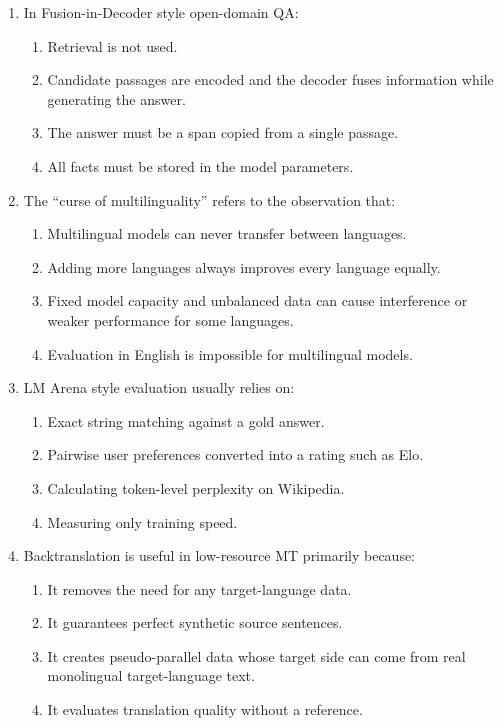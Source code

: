 \documentclass[11pt,a4paper]{article}
\begin{document}
\begin{enumerate}[leftmargin=*]
\begin{enumerate}
\item In Fusion-in-Decoder style open-domain QA:
\begin{enumerate}[label=\Alph*.]
\item Retrieval is not used.
\item Candidate passages are encoded and the decoder fuses information while generating the answer.
\item The answer must be a span copied from a single passage.
\item All facts must be stored in the model parameters.
\end{enumerate}

\item The ``curse of multilinguality'' refers to the observation that:
\begin{enumerate}[label=\Alph*.]
\item Multilingual models can never transfer between languages.
\item Adding more languages always improves every language equally.
\item Fixed model capacity and unbalanced data can cause interference or weaker performance for some languages.
\item Evaluation in English is impossible for multilingual models.
\end{enumerate}

\item LM Arena style evaluation usually relies on:
\begin{enumerate}[label=\Alph*.]
\item Exact string matching against a gold answer.
\item Pairwise user preferences converted into a rating such as Elo.
\item Calculating token-level perplexity on Wikipedia.
\item Measuring only training speed.
\end{enumerate}

\item Backtranslation is useful in low-resource MT primarily because:
\begin{enumerate}[label=\Alph*.]
\item It removes the need for any target-language data.
\item It guarantees perfect synthetic source sentences.
\item It creates pseudo-parallel data whose target side can come from real monolingual target-language text.
\item It evaluates translation quality without a reference.
\end{enumerate}


\end{enumerate}
\end{enumerate}
\end{document}
